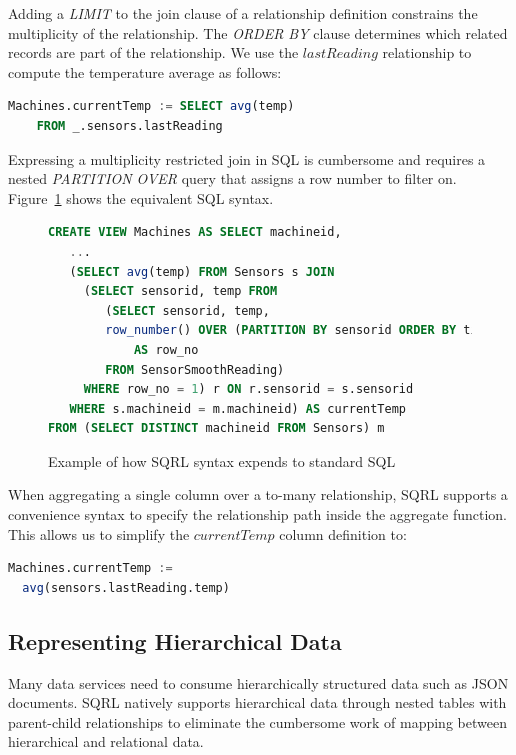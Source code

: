 \documentclass[	DIV=calc,%
							paper=letter,%
							fontsize=11pt,%
							twocolumn]{scrartcl}	 					%
\begin{document}
Adding a \emph{LIMIT} to the join clause of a relationship definition constrains the multiplicity of the relationship. The \emph{ORDER BY} clause determines which related records are part of the relationship. We use the $lastReading$ relationship to compute the temperature average as follows:

\begin{lstlisting}[language=SQL]
Machines.currentTemp := SELECT avg(temp)
    FROM _.sensors.lastReading
\end{lstlisting}

Expressing a multiplicity restricted join in SQL is cumbersome and requires a nested \emph{PARTITION OVER} query that assigns a row number to filter on. Figure~\ref{fig:machinesPartitionOver} shows the equivalent SQL syntax.

\begin{figure}
\begin{lstlisting}[language=SQL]
CREATE VIEW Machines AS SELECT machineid,
   ...
   (SELECT avg(temp) FROM Sensors s JOIN
     (SELECT sensorid, temp FROM
        (SELECT sensorid, temp,
        row_number() OVER (PARTITION BY sensorid ORDER BY time_min DESC)
            AS row_no
        FROM SensorSmoothReading)
     WHERE row_no = 1) r ON r.sensorid = s.sensorid
   WHERE s.machineid = m.machineid) AS currentTemp
FROM (SELECT DISTINCT machineid FROM Sensors) m
\end{lstlisting}
\caption{Example of how SQRL syntax expends to standard SQL}
\label{fig:machinesPartitionOver}
\end{figure}

When aggregating a single column over a to-many relationship, SQRL supports a convenience syntax to specify the relationship path inside the aggregate function. This allows us to simplify the $currentTemp$ column definition to:

\begin{lstlisting}[language=SQL]
Machines.currentTemp :=
  avg(sensors.lastReading.temp)
\end{lstlisting}

\subsection{Representing Hierarchical Data}

Many data services need to consume hierarchically structured data such as JSON documents. SQRL natively supports hierarchical data through nested tables with parent-child relationships to eliminate the cumbersome work of mapping between hierarchical and relational data.
\end{document}
